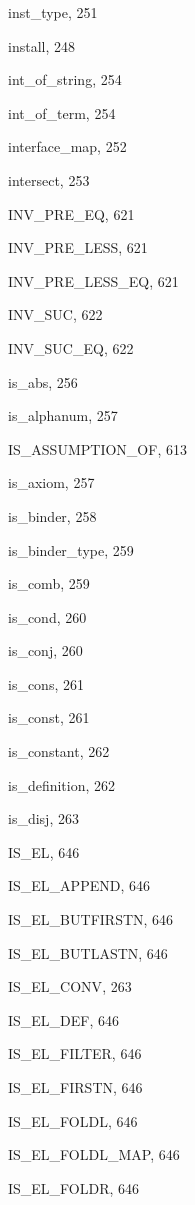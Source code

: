 \begin{theindex}
  \item {\ptt inst\_type}, 251
  \item {\ptt install}, 248
  \item {\ptt int\_of\_string}, 254
  \item {\ptt int\_of\_term}, 254
  \item {\ptt interface\_map}, 252
  \item {\ptt intersect}, 253
  \item {\ptt INV\_PRE\_EQ}, 621
  \item {\ptt INV\_PRE\_LESS}, 621
  \item {\ptt INV\_PRE\_LESS\_EQ}, 621
  \item {\ptt INV\_SUC}, 622
  \item {\ptt INV\_SUC\_EQ}, 622
  \item {\ptt is\_abs}, 256
  \item {\ptt is\_alphanum}, 257
  \item {\ptt IS\_ASSUMPTION\_OF}, 613
  \item {\ptt is\_axiom}, 257
  \item {\ptt is\_binder}, 258
  \item {\ptt is\_binder\_type}, 259
  \item {\ptt is\_comb}, 259
  \item {\ptt is\_cond}, 260
  \item {\ptt is\_conj}, 260
  \item {\ptt is\_cons}, 261
  \item {\ptt is\_const}, 261
  \item {\ptt is\_constant}, 262
  \item {\ptt is\_definition}, 262
  \item {\ptt is\_disj}, 263
  \item {\ptt IS\_EL}, 646
  \item {\ptt IS\_EL\_APPEND}, 646
  \item {\ptt IS\_EL\_BUTFIRSTN}, 646
  \item {\ptt IS\_EL\_BUTLASTN}, 646
  \item {\ptt IS\_EL\_CONV}, 263
  \item {\ptt IS\_EL\_DEF}, 646
  \item {\ptt IS\_EL\_FILTER}, 646
  \item {\ptt IS\_EL\_FIRSTN}, 646
  \item {\ptt IS\_EL\_FOLDL}, 646
  \item {\ptt IS\_EL\_FOLDL\_MAP}, 646
  \item {\ptt IS\_EL\_FOLDR}, 646

\end{theindex}

